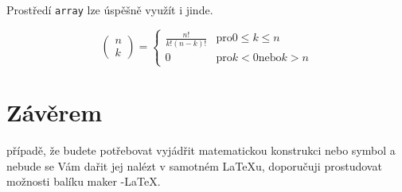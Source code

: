 \documentclass[a4paper, 11pt, twocolumn]{article}
\theoremstyle{definition}
\theoremstyle{definition}
\begin{document}
Prostředí \verb|array| lze úspěšně využít i jinde.

$$
\left(
\begin{array}{c}
n\\
k
\end{array}
\right) =
\left\{
\begin{array}{ll}
\frac{n!}{k!(n-k)!} & \text{pro} 0 \leq k \leq n\\
0 & \text{pro} k < 0 \text{nebo} k > n
\end{array}
\right.
$$

\section{Závěrem}
případě, že budete potřebovat vyjádřit matematickou konstrukci nebo symbol a nebude se Vám dařit jej nalézt v samotném \LaTeX u, doporučuji prostudovat možnosti balíku maker \AmS-\LaTeX.
\end{document}
